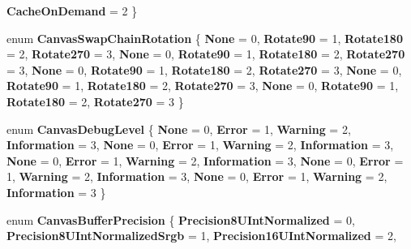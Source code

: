 \begin{DoxyCompactItemize}
{\bfseries Cache\+On\+Demand} = 2
 \}
\item 
\mbox{\label{namespace_microsoft_1_1_graphics_1_1_canvas_a1cf1111048d43d97b2294d0ff727e25c}} 
enum {\bfseries Canvas\+Swap\+Chain\+Rotation} \{ \newline
{\bfseries None} = 0, 
{\bfseries Rotate90} = 1, 
{\bfseries Rotate180} = 2, 
{\bfseries Rotate270} = 3, 
\newline
{\bfseries None} = 0, 
{\bfseries Rotate90} = 1, 
{\bfseries Rotate180} = 2, 
{\bfseries Rotate270} = 3, 
\newline
{\bfseries None} = 0, 
{\bfseries Rotate90} = 1, 
{\bfseries Rotate180} = 2, 
{\bfseries Rotate270} = 3, 
\newline
{\bfseries None} = 0, 
{\bfseries Rotate90} = 1, 
{\bfseries Rotate180} = 2, 
{\bfseries Rotate270} = 3, 
\newline
{\bfseries None} = 0, 
{\bfseries Rotate90} = 1, 
{\bfseries Rotate180} = 2, 
{\bfseries Rotate270} = 3
 \}
\item 
\mbox{\label{namespace_microsoft_1_1_graphics_1_1_canvas_a2ef0aec53b3f7fd6d2b7d2fe3f4cec34}} 
enum {\bfseries Canvas\+Debug\+Level} \{ \newline
{\bfseries None} = 0, 
{\bfseries Error} = 1, 
{\bfseries Warning} = 2, 
{\bfseries Information} = 3, 
\newline
{\bfseries None} = 0, 
{\bfseries Error} = 1, 
{\bfseries Warning} = 2, 
{\bfseries Information} = 3, 
\newline
{\bfseries None} = 0, 
{\bfseries Error} = 1, 
{\bfseries Warning} = 2, 
{\bfseries Information} = 3, 
\newline
{\bfseries None} = 0, 
{\bfseries Error} = 1, 
{\bfseries Warning} = 2, 
{\bfseries Information} = 3, 
\newline
{\bfseries None} = 0, 
{\bfseries Error} = 1, 
{\bfseries Warning} = 2, 
{\bfseries Information} = 3
 \}
\item 
\mbox{\label{namespace_microsoft_1_1_graphics_1_1_canvas_a9383a4c9a246b43c162a06fc29843c53}} 
enum {\bfseries Canvas\+Buffer\+Precision} \{ \newline
{\bfseries Precision8\+U\+Int\+Normalized} = 0, 
{\bfseries Precision8\+U\+Int\+Normalized\+Srgb} = 1, 
{\bfseries Precision16\+U\+Int\+Normalized} = 2, 

\end{DoxyCompactItemize}
